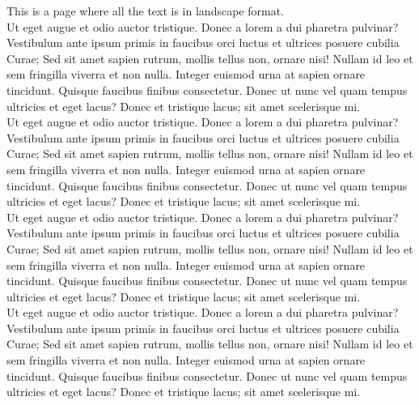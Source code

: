 \documentclass[12pt]{article}
\begin{document}
\begin{landscape}
\noindent This is a page where all the text is in landscape format.\\

\noindent Ut eget augue et odio auctor tristique. Donec a lorem a dui pharetra pulvinar?
Vestibulum ante ipsum primis in faucibus orci luctus et ultrices posuere cubilia
Curae; Sed sit amet sapien rutrum, mollis tellus non, ornare nisi! Nullam id leo
et sem fringilla viverra et non nulla. Integer euismod urna at sapien ornare
tincidunt. Quisque faucibus finibus consectetur. Donec ut nunc vel quam tempus
ultricies et eget lacus? Donec et tristique lacus; sit amet scelerisque mi.\\

\noindent Ut eget augue et odio auctor tristique. Donec a lorem a dui pharetra pulvinar?
Vestibulum ante ipsum primis in faucibus orci luctus et ultrices posuere cubilia
Curae; Sed sit amet sapien rutrum, mollis tellus non, ornare nisi! Nullam id leo
et sem fringilla viverra et non nulla. Integer euismod urna at sapien ornare
tincidunt. Quisque faucibus finibus consectetur. Donec ut nunc vel quam tempus
ultricies et eget lacus? Donec et tristique lacus; sit amet scelerisque mi.\\

\noindent Ut eget augue et odio auctor tristique. Donec a lorem a dui pharetra pulvinar?
Vestibulum ante ipsum primis in faucibus orci luctus et ultrices posuere cubilia
Curae; Sed sit amet sapien rutrum, mollis tellus non, ornare nisi! Nullam id leo
et sem fringilla viverra et non nulla. Integer euismod urna at sapien ornare
tincidunt. Quisque faucibus finibus consectetur. Donec ut nunc vel quam tempus
ultricies et eget lacus? Donec et tristique lacus; sit amet scelerisque mi.\\

\noindent Ut eget augue et odio auctor tristique. Donec a lorem a dui pharetra pulvinar?
Vestibulum ante ipsum primis in faucibus orci luctus et ultrices posuere cubilia
Curae; Sed sit amet sapien rutrum, mollis tellus non, ornare nisi! Nullam id leo
et sem fringilla viverra et non nulla. Integer euismod urna at sapien ornare
tincidunt. Quisque faucibus finibus consectetur. Donec ut nunc vel quam tempus
ultricies et eget lacus? Donec et tristique lacus; sit amet scelerisque mi.
\end{landscape}
\end{document}
